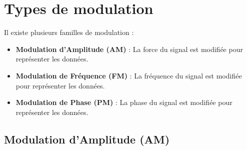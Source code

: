 \documentclass[a4paper,draft,twocolumn]{report}
\begin{document}
\section{Types de modulation}
Il existe plusieurs familles de modulation :
\begin{itemize}
    \item \textbf{Modulation d'Amplitude (AM)} : La force du signal est modifiée pour représenter les données.
    \item \textbf{Modulation de Fréquence (FM)} : La fréquence du signal est modifiée pour représenter les données.
    \item \textbf{Modulation de Phase (PM)} : La phase du signal est modifiée pour représenter les données.
\end{itemize}

\subsection{Modulation d'Amplitude (AM)}
\end{document}

